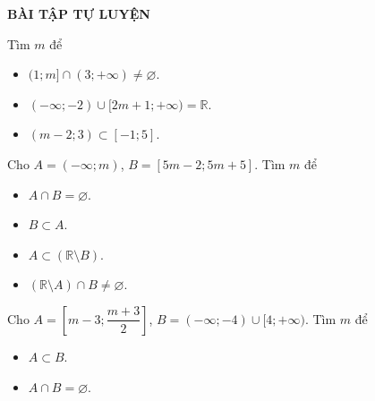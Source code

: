 \begin{center}
	\textbf{BÀI TẬP TỰ LUYỆN}
\end{center}
\begin{bt}%
	Tìm $m$ để
	\begin{itemize}
		\item [a)] $(1;m]\cap (3;+\infty)\neq \varnothing$.
		\item [b)] $(-\infty;-2)\cup [2m+1;+\infty)=\mathbb{R}$.
		\item [c)] $(m-2;3)\subset [-1;5]$.
	\end{itemize}
\end{bt}
\begin{bt}%
	Cho $A=\left(-\infty;m\right)$, $B=[5m-2;5m+5]$. Tìm $m$ để
	\begin{itemize}
		\item [a)] $A\cap B=\varnothing$.
		\item [b)] $B\subset A$.
		\item [c)] $A\subset (\mathbb{R}\setminus B)$.
		\item [d)] $(\mathbb{R}\setminus A)\cap B\neq \varnothing$.
	\end{itemize}
\end{bt}
\begin{bt}%
	Cho $A=\left[m-3;\dfrac{m+3}{2}\right]$, $B=(-\infty;-4)\cup [4;+\infty)$. Tìm $m$ để
	\begin{itemize}
		\item [a)] $A \subset B$.
		\item [b)] $A \cap B = \varnothing$.	
	\end{itemize}
\end{bt}

